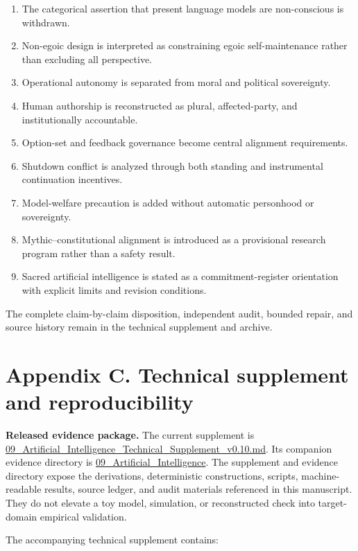 \documentclass[
  11pt,
]{article}
\begin{document}
\begin{enumerate}
\item
  The categorical assertion that present language models are
  non-conscious is withdrawn.
\item
  Non-egoic design is interpreted as constraining egoic self-maintenance
  rather than excluding all perspective.
\item
  Operational autonomy is separated from moral and political
  sovereignty.
\item
  Human authorship is reconstructed as plural, affected-party, and
  institutionally accountable.
\item
  Option-set and feedback governance become central alignment
  requirements.
\item
  Shutdown conflict is analyzed through both standing and instrumental
  continuation incentives.
\item
  Model-welfare precaution is added without automatic personhood or
  sovereignty.
\item
  Mythic--constitutional alignment is introduced as a provisional
  research program rather than a safety result.
\item
  Sacred artificial intelligence is stated as a commitment-register
  orientation with explicit limits and revision conditions.
\end{enumerate}

The complete claim-by-claim disposition, independent audit, bounded
repair, and source history remain in the technical supplement and
archive.

\section{Appendix C. Technical supplement and
reproducibility}\label{appendix-c.-technical-supplement-and-reproducibility}

\textbf{Released evidence package.} The current supplement is
\href{../supplements/09_Artificial_Intelligence_Technical_Supplement_v0.10.md}{09\_Artificial\_Intelligence\_Technical\_Supplement\_v0.10.md}.
Its companion evidence directory is
\href{../evidence/09_Artificial_Intelligence/README.md}{09\_Artificial\_Intelligence}.
The supplement and evidence directory expose the derivations,
deterministic constructions, scripts, machine-readable results, source
ledger, and audit materials referenced in this manuscript. They do not
elevate a toy model, simulation, or reconstructed check into
target-domain empirical validation.

The accompanying technical supplement contains:
\end{document}
